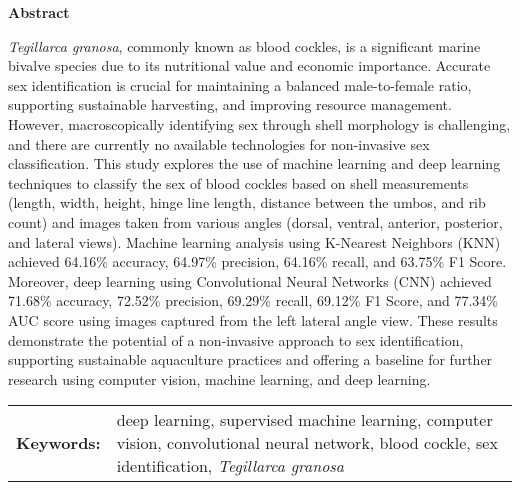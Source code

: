 \begin{center}
	\textbf{Abstract}
\end{center}
\setlength{\parindent}{0pt}
\textit{Tegillarca granosa}, commonly known as blood cockles, is a significant marine bivalve species due to its nutritional value and economic importance. Accurate sex identification is crucial for maintaining a balanced male-to-female ratio, supporting sustainable harvesting, and improving resource management. However, macroscopically identifying sex through shell morphology is challenging, and there are currently no available technologies for non-invasive sex classification. This study explores the use of machine learning and deep learning techniques to classify the sex of blood cockles based on shell measurements (length, width, height, hinge line length, distance between the umbos, and rib count) and images taken from various angles (dorsal, ventral, anterior, posterior, and lateral views). Machine learning analysis using K-Nearest Neighbors (KNN) achieved 64.16\% accuracy, 64.97\% precision, 64.16\% recall, and 63.75\% F1 Score. Moreover, deep learning using Convolutional Neural Networks (CNN) achieved 71.68\% accuracy, 72.52\% precision, 69.29\% recall, 69.12\% F1 Score, and 77.34\% AUC score using images captured from the left lateral angle view. These results demonstrate the potential of a non-invasive approach to sex identification, supporting sustainable aquaculture practices and offering a baseline for further research using computer vision, machine learning, and deep learning.

\begin{tabular}{lp{4.25in}}
	\hspace{-0.5em}\textbf{Keywords:}\hspace{0.25em} & deep learning, supervised machine learning, computer vision, convolutional neural network, blood cockle, sex identification, \textit{Tegillarca granosa}\\
\end{tabular}
